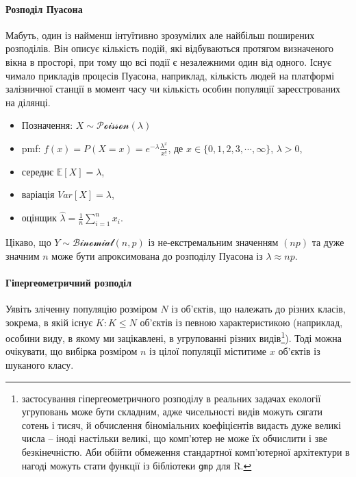 \documentclass[
  11pt,
]{book}
\begin{document}
\paragraph{Розподіл
Пуасона}\label{ux440ux43eux437ux43fux43eux434ux456ux43b-ux43fux443ux430ux441ux43eux43dux430}

Мабуть, один із найменш інтуїтивно зрозумілих але найбільш поширених
розподілів. Він описує кількість подій, які відбуваються протягом
визначеного вікна в просторі, при тому що всі події є незалежними один
від одного. Існує чимало прикладів процесів Пуасона, наприклад,
кількість людей на платформі залізничної станції в момент часу чи
кількість особин популяції зареєстрованих на ділянці.

\begin{itemize}
\item
  Позначення: \(X \sim \mathcal{Poisson}(\lambda)\)
\item
  pmf: \(f(x) = P(X = x) = e^{-\lambda} \frac{\lambda^x}{x!}\), де
  \(x \in \{0, 1, 2, 3, \cdots, \infty \}\), \(\lambda > 0\),
\item
  середнє \(\mathbb{E} [X] = \lambda\),
\item
  варіація \(Var[X] = \lambda\),
\item
  оцінщик \(\hat{\lambda} = \frac{1}{n} \sum \limits_{i=1}^{n}x_i\).
\end{itemize}

Цікаво, що \(Y \sim \mathcal{Binomial}(n, p)\) із не-екстремальним
значенням \((np)\) та дуже значним \(n\) може бути апроксимована до
розподілу Пуасона із \(\lambda \approx np\).

\paragraph{Гіпергеометричний
розподіл}\label{ux433ux456ux43fux435ux440ux433ux435ux43eux43cux435ux442ux440ux438ux447ux43dux438ux439-ux440ux43eux437ux43fux43eux434ux456ux43b}

Уявіть зліченну популяцію розміром \(N\) із об'єктів, що належать до
різних класів, зокрема, в якій існує \(K: K \leq N\) об'єктів із певною
характеристикою (наприклад, особини виду, в якому ми зацікавлені, в
угрупованні різних видів\footnote{застосування гіпергеометричного
  розподілу в реальних задачах екології угруповань може бути складним,
  адже чисельності видів можуть сягати сотень і тисяч, й обчислення
  біноміальних коефіцієнтів видасть дуже великі числа -- іноді настільки
  великі, що комп'ютер не може їх обчислити і зве безкінечністю. Аби
  обійти обмеження стандартної комп'ютерної архітектури в нагоді можуть
  стати функції із бібліотеки \texttt{gmp} для R.}). Тоді можна
очікувати, що вибірка розміром \(n\) із цілої популяції міститиме \(x\)
об'єктів із шуканого класу.
\end{document}
